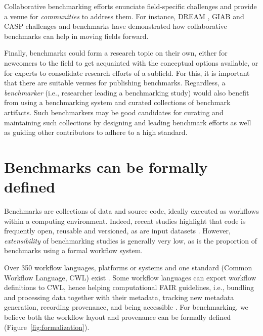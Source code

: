 \documentclass[11pt]{article}
\begin{document}
{\color{red} Collaborative benchmarking efforts enunciate field-specific challenges and provide a venue for \emph{communities} to address them. For instance, DREAM \cite{meyer2021advances}, GIAB \cite{zook2019open} and CASP \cite{moult2005-ne} challenges and benchmarks have demonstrated how collaborative benchmarks can help in moving fields forward.}

Finally, benchmarks could form a research topic on their own, either for newcomers to the field to get acquainted with the conceptual options available, or for experts to consolidate research efforts of a subfield. For this, it is important that there are suitable venues for publishing benchmarks. Regardless, a \emph{benchmarker} (i.e., researcher leading a benchmarking study) would also benefit from using a benchmarking system and curated collections of benchmark artifacts. Such benchmarkers may be good candidates for curating and maintaining such collections by designing and leading benchmark efforts as well as guiding other contributors to adhere to a high standard. 

\section*{Benchmarks can be formally defined}

Benchmarks are collections of data and source code, ideally executed as workflows within a computing environment. Indeed, recent studies highlight that code is frequently open, reusable and versioned, as are input datasets \cite{cao2023-jz, Sonrel2023-te}. However, \textit{extensibility} of benchmarking studies is generally very low, as is the proportion of benchmarks using a formal workflow system. 

Over 350 workflow languages, platforms or systems  \cite{Wratten2021-el, Amstutz2024-qk} and one standard (Common Workflow Language, CWL) exist \cite{Amstutz2016-vo}. Some workflow languages can export workflow definitions to CWL, hence helping computational FAIR guidelines, i.e., bundling and processing data together with their metadata, tracking new metadata generation, recording provenance, and being accessible \cite{Goble2020-ps}. For benchmarking, we believe both the workflow layout and provenance can be formally defined (Figure~\ref{fig:formalization}). 
\end{document}
